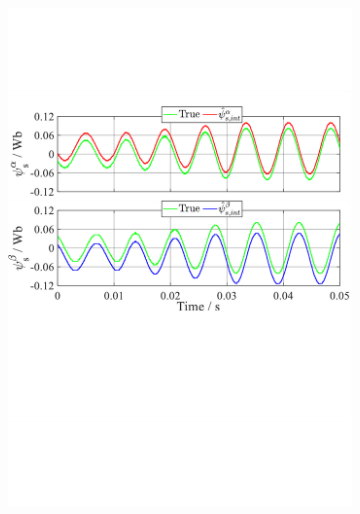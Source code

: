 \begin{figure}[h]
    \centering
    \begin{subfigure}[b]{0.80\textwidth}
        \centering
        \includegraphics[scale=0.57]{chapters/Fig4.4a.pdf}
        \caption{}
        \label{Fig:4.4a}
    \end{subfigure}
    \vfill
    \begin{subfigure}[b]{0.80\textwidth}
        \centering

\end{subfigure}
\end{figure}
